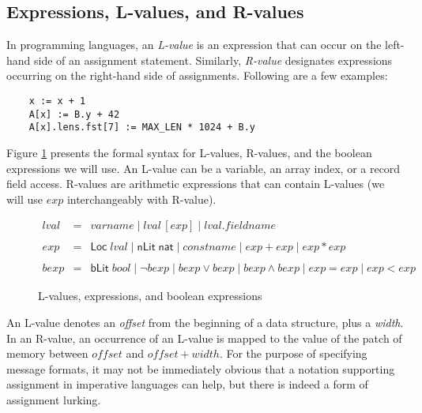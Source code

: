 \documentclass[svgnames]{llncs}
\newcommand{\konst}[1]{\ensuremath{\mathsf{#1}}}
\begin{document}
\subsection{Expressions, L-values, and R-values}

In programming languages, an \emph{L-value} is an expression that can
occur on the left-hand side of an assignment statement. Similarly,
\emph{R-value} designates expressions occurring on the right-hand side
of assignments. Following are a few examples:

\begin{verbatim}
    x := x + 1
    A[x] := B.y + 42
    A[x].lens.fst[7] := MAX_LEN * 1024 + B.y
\end{verbatim}

Figure \ref{Lvalues} presents the formal syntax for L-values, R-values,
and the boolean expressions we will use.  An L-value can be
a variable, an array index, or a record field access. R-values are
arithmetic expressions that can contain L-values (we will use
$\mathit{exp}$ interchangeably with R-value).

\begin{figure}
\[
\begin{array}{rcl}
\mathit{lval} & = & \mathit{varname} \mid
                    \mathit{lval} \, [ \mathit{exp} ] \mid
                    \mathit{lval} . \mathit{fieldname} \\
  & & \\
\mathit{exp} & = & \konst{Loc}\; \mathit{lval}
              \mid \konst{nLit}\; \konst{nat}
              \mid \mathit{constname}
              \mid \mathit{exp} + \mathit{exp}
              \mid \mathit{exp} * \mathit{exp} \\
  & & \\
\mathit{bexp} & = & \konst{bLit}\; bool
              \mid  \neg \mathit{bexp}
              \mid  \mathit{bexp} \lor \mathit{bexp}
              \mid  \mathit{bexp} \land \mathit{bexp}
              \mid  \mathit{exp} = \mathit{exp}
              \mid  \mathit{exp} < \mathit{exp}
\end{array}
\]
\caption{L-values, expressions, and boolean expressions}
\label{Lvalues}
\end{figure}

An L-value denotes an \emph{offset} from the beginning of a
data structure, plus a \emph{width}. In an R-value, an occurrence of an
L-value is mapped to the value of the patch of memory between
$\mathit{offset}$ and $\mathit{offset} + \mathit{width}$. For the
purpose of specifying message formats, it may not be immediately
obvious that a notation supporting assignment in imperative languages
can help, but there is indeed a form of assignment lurking.
\end{document}
